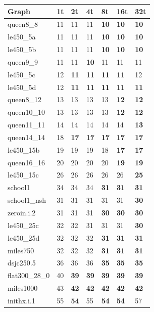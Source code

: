 \documentclass[12pt,a4paper,twoside]{scrartcl}
\numberwithin{equation}{section}
\begin{document}
\begin{table}[H]
\begin{center}

    \begin{tabular}{| l | l l l l l p{1cm}|}
\hline
Graph&1t&2t&4t&8t&16t&32t\\ \hline
queen8\_8&11&11&11&\textbf{10}&\textbf{10}&\textbf{10}  \\ 
le450\_5a&11&11&11&\textbf{10}&\textbf{10}&\textbf{10}  \\
le450\_5b&11&11&11&\textbf{10}&\textbf{10}&\textbf{10}  \\
queen9\_9&11&11&\textbf{10}&11&11&11  \\
le450\_5c&12&\textbf{11}&\textbf{11}&\textbf{11}&\textbf{11}&12  \\\hline 
le450\_5d&12&\textbf{11}&\textbf{11}&\textbf{11}&\textbf{11}&\textbf{11}  \\ 
queen8\_12&13&13&13&13&\textbf{12}&\textbf{12}  \\
queen10\_10&13&13&13&13&\textbf{12}&\textbf{12}  \\ 
queen11\_11&14&14&14&14&14&\textbf{13}  \\
queen14\_14&18&\textbf{17}&\textbf{17}&\textbf{17}&\textbf{17}&\textbf{17}  \\\hline 
le450\_15b&19&19&19&18&\textbf{17}&\textbf{17}  \\ 
queen16\_16&20&20&20&20&\textbf{19}&\textbf{19}  \\
le450\_15c&26&26&26&26&26&\textbf{25}  \\
school1&34&34&34&\textbf{31}&\textbf{31}&\textbf{31}  \\
school1\_nsh&31&31&31&31&31&\textbf{30}  \\ \hline
zeroin.i.2&31&31&31&\textbf{30}&\textbf{30}&\textbf{30}  \\
le450\_25c&32&32&31&31&31&\textbf{30}  \\ 
le450\_25d&32&32&32&\textbf{31}&\textbf{31}&\textbf{31}  \\ 
miles750&32&32&32&\textbf{31}&\textbf{31}&\textbf{31}  \\ 
dsjc250.5&36&36&36&\textbf{35}&\textbf{35}&\textbf{35}  \\ \hline
flat300\_28\_0&40&\textbf{39}&\textbf{39}&\textbf{39}&\textbf{39}&\textbf{39}  \\
miles1000&43&\textbf{42}&\textbf{42}&\textbf{42}&\textbf{42}&\textbf{42}  \\
inithx.i.1&55&\textbf{54}&55&\textbf{54}&\textbf{54}&57  \\ 

\end{tabular}
\end{center}
\end{table}
\end{document}
